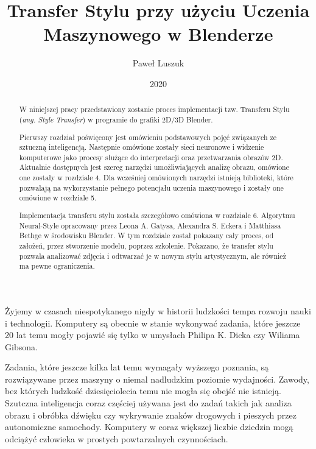 \documentclass[openright]{xmgr}
\author   {Paweł Luszuk}
\title    {Transfer Stylu przy użyciu Uczenia Maszynowego w Blenderze}
\date     {2020}
\begin{document}
\begin{abstract}

\indent \indent W niniejszej pracy przedstawiony zostanie proces implementacji tzw. Transferu Stylu (\textit{ang. Style Transfer}) w programie do grafiki 2D/3D Blender.

Pierwszy rozdział poświęcony jest omówieniu podstawowych pojęć związanych ze sztuczną inteligencją. Następnie omówione zostały sieci neuronowe i widzenie komputerowe jako procesy służące do interpretacji oraz przetwarzania obrazów 2D. Aktualnie dostępnych jest szereg narzędzi umożliwiających analizę obrazu, omówione one zostały w rozdziale 4. Dla wcześniej omówionych narzędzi istnieją biblioteki, które pozwalają na wykorzystanie pełnego potencjału uczenia maszynowego i zostały one omówione w rozdziale 5.

Implementacja transferu stylu została szczegółowo omówiona w rozdziale 6. Algorytmu Neural-Style opracowany przez Leona A. Gatysa, Alexandra S. Eckera i Matthiasa Bethge w środowisku Blender. W tym rozdziale został pokazany cały proces, od założeń, przez stworzenie modelu, poprzez szkolenie. Pokazano, że transfer stylu pozwala analizować zdjęcia i odtwarzać je w nowym stylu artystycznym, ale również ma pewne ograniczenia. 
\end{abstract}


\maketitle

\introduction

\indent \indent Żyjemy w czasach niespotykanego nigdy w historii ludzkości tempa rozwoju nauki i technologii. Komputery są obecnie w stanie wykonywać zadania, które jeszcze 20 lat temu mogły pojawić się tylko w umysłach Philipa K. Dicka czy Wiliama Gibsona.

Zadania, które jeszcze kilka lat temu wymagały wyższego poznania, są rozwiązywane przez maszyny o niemal nadludzkim poziomie wydajności. Zawody, bez których ludzkość dziesięciolecia temu nie mogła się obejść nie istnieją. Szutczna inteligencja coraz częściej używana jest do zadań takich jak analiza obrazu i obróbka dźwięku czy wykrywanie znaków drogowych i pieszych przez autonomiczne samochody. Komputery w coraz większej liczbie dziedzin mogą odciążyć człowieka w prostych powtarzalnych czynnościach.
\end{document}
